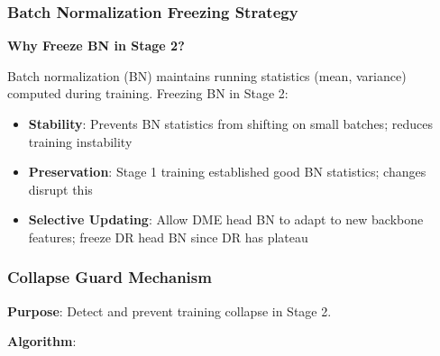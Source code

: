 \documentclass[12pt,a4paper]{article}
\begin{document}
\subsubsection{Batch Normalization Freezing Strategy}

\textbf{Why Freeze BN in Stage 2?}

Batch normalization (BN) maintains running statistics (mean, variance) computed during training. Freezing BN in Stage 2:

\begin{itemize}
    \item \textbf{Stability}: Prevents BN statistics from shifting on small batches; reduces training instability
    \item \textbf{Preservation}: Stage 1 training established good BN statistics; changes disrupt this
    \item \textbf{Selective Updating}: Allow DME head BN to adapt to new backbone features; freeze DR head BN since DR has plateau
\end{itemize}

\subsubsection{Collapse Guard Mechanism}

\textbf{Purpose}: Detect and prevent training collapse in Stage 2.

\textbf{Algorithm}:
\end{document}
